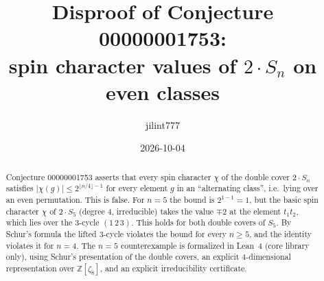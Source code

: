\documentclass[11pt]{article}
\title{Disproof of Conjecture 00000001753:\\
spin character values of $2\cdot S_n$ on even classes}
\author{jilint777}
\date{2026-10-04}
\theoremstyle{remark}
\begin{document}
\sloppy
\maketitle

\begin{abstract}
Conjecture 00000001753 asserts that every spin character $\chi$ of the double cover
$2\cdot S_n$ satisfies $|\chi(g)|\le 2^{\lfloor n/4\rfloor-1}$ for every element $g$ in an
``alternating class'', i.e.\ lying over an even permutation. This is false. For $n=5$ the
bound is $2^{1-1}=1$, but the basic spin character $\chi$ of $2\cdot S_5$ (degree $4$,
irreducible) takes the value $\mp2$ at the element $t_1t_2$, which lies over the
$3$-cycle $(1\,2\,3)$. This holds for both double covers of $S_5$. By Schur's formula the
lifted $3$-cycle violates the bound for every $n\ge5$, and the identity violates it for
$n=4$. The $n=5$ counterexample is formalized in Lean~4 (core library only), using Schur's
presentation of the double covers, an explicit $4$-dimensional representation over
$\mathbb{Z}[\zeta_8]$, and an explicit irreducibility certificate.
\end{abstract}
\end{document}
